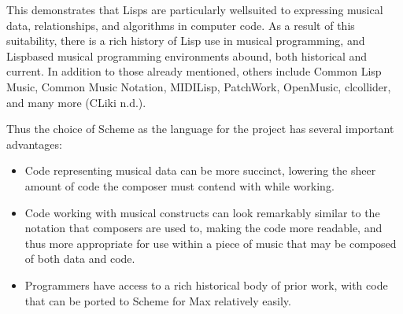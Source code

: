 \documentclass[letterpaper,10pt,english]{sphinxmanual}
\begin{document}
\begin{sphinxVerbatim}[commandchars=\\\{\}]

\end{sphinxVerbatim}

\sphinxAtStartPar
This demonstrates that Lisps are particularly well\sphinxhyphen{}suited to expressing musical data, relationships, and algorithms in
computer code.
As a result of this suitability, there is a rich history of Lisp use in musical programming,
and Lisp\sphinxhyphen{}based musical programming environments abound, both historical and current. In addition
to those already mentioned, others include
Common Lisp Music, Common Music Notation, MIDI\sphinxhyphen{}Lisp, PatchWork, OpenMusic, cl\sphinxhyphen{}collider, and many more (CLiki n.d.).

\sphinxAtStartPar
Thus the choice of Scheme as the language for the project has several important advantages:
\begin{itemize}
\item {} 
\sphinxAtStartPar
Code representing musical data can be more succinct, lowering the sheer amount of code the composer must contend with while working.

\item {} 
\sphinxAtStartPar
Code working with musical constructs can look remarkably similar to the notation that composers are used to, making the code
more readable, and thus more appropriate for use within a piece of music that may be composed of both data and code.

\item {} 
\sphinxAtStartPar
Programmers have access to a rich historical body of prior work, with code that can be ported to Scheme for Max relatively easily.

\end{itemize}
\end{document}
